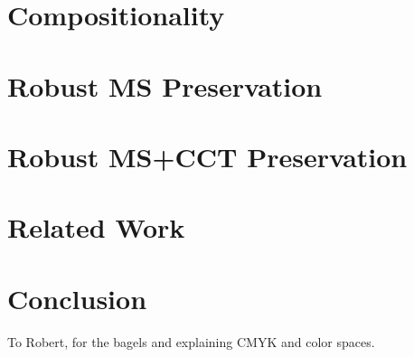 \documentclass[acmsmall,review,screen]{acmart}
\begin{document}
\section{Compositionality}

\section{Robust MS Preservation}

\section{Robust MS+CCT Preservation}

\section{Related Work}


\section{Conclusion}


\begin{acks}
To Robert, for the bagels and explaining CMYK and color spaces.
\end{acks}




\appendix
\end{document}
